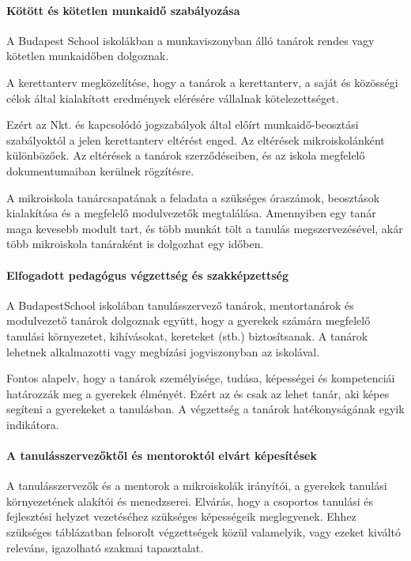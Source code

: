 \paragraph{Kötött és kötetlen munkaidő szabályozása}

A Budapest School iskolákban a munkaviszonyban álló tanárok rendes vagy kötetlen
munkaidőben dolgoznak.

A kerettanterv megközelítése, hogy a tanárok a kerettanterv, a saját és közösségi
célok által kialakított eredmények elérésére vállalnak kötelezettséget.

Ezért az Nkt. és kapcsolódó jogszabályok által előírt munkaidő-beosztási szabályoktól a jelen kerettanterv eltérést enged. Az eltérések mikroiskolánként különbözőek. Az eltérések a tanárok szerződéseiben, és az iskola megfelelő dokumentumaiban kerülnek rögzítésre.

A mikroiskola tanárcsapatának a
feladata a szükséges óraszámok, beosztások kialakítása és a megfelelő
modulvezetők megtalálása. Amennyiben egy tanár maga kevesebb modult tart, és
több munkát tölt a tanulás megszervezésével, akár több mikroiskola tanáraként
is dolgozhat egy időben.

\paragraph{Elfogadott pedagógus végzettség és szakképzettség}

A Budapest\break School iskolában tanulásszervező tanárok, mentortanárok és
modulvezető tanárok dolgoznak együtt, hogy a gyerekek számára megfelelő
tanulási környezetet, kihívásokat, kereteket (stb.) biztosítsanak. A tanárok
lehetnek alkalmazotti vagy megbízási jogviszonyban az iskolával.

Fontos alapelv, hogy a tanárok személyisége, tudása, képességei és
kompetenciái határozzák meg a gyerekek élményét.  Ezért az és csak az lehet
tanár, aki képes segíteni a gyerekeket a
tanulásban. A végzettség a tanárok hatékonyságának egyik indikátora.

\paragraph{A tanulásszervezőktől és mentoroktól elvárt képesítések} A
tanulásszervezők és a mentorok a mikroiskolák irányítói, a gyerekek tanulási
környezetének alakítói és menedzserei. Elvárás, hogy a csoportos tanulási és
fejlesztési helyzet vezetéséhez szükséges képességeik meglegyenek. Ehhez
szükséges  táblázatban felsorolt végzettségek közül
valamelyik, vagy ezeket kiváltó
releváns, igazolható szakmai tapasztalat.

